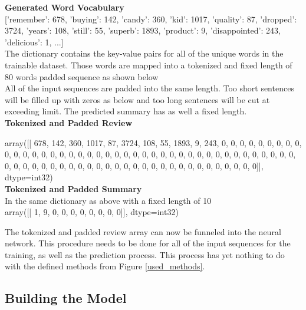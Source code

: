 \begin{tcolorbox}
	
	\textbf{Generated Word Vocabulary} \\
	
	['remember': 678, 'buying': 142, 'candy': 360, 
	'kid': 1017, 'quality': 87, 'dropped': 3724,
	 'years': 108, 'still': 55, 'superb': 1893, 
	 'product': 9, 'disappointed': 243, 'delicious': 1, ...] \\ 
 
    The dictionary contains the key-value pairs for all of the unique words in the trainable dataset. Those words are mapped into a tokenized and fixed length of 80 words padded sequence as shown below \\
    
    All of the input sequences are padded into the same length. Too short sentences will be filled up with zeros as below and too long sentences will be cut at exceeding limit. The predicted summary has as well a fixed length. \\
	
	\textbf{Tokenized and Padded Review}
	
	array([[ 678,  142,  360, 1017,   87, 3724,  108,   55, 1893,    9,  243,
	0,    0,    0,    0,    0,    0,    0,    0,    0,    0,    0,
	0,    0,    0,    0,    0,    0,    0,    0,    0,    0,    0,
	0,    0,    0,    0,    0,    0,    0,    0,    0,    0,    0,
	0,    0,    0,    0,    0,    0,    0,    0,    0,    0,    0,
	0,    0,    0,    0,    0,    0,    0,    0,    0,    0,    0,
	0,    0,    0,    0,    0,    0,    0,    0,    0,    0,    0,
	0,    0,    0]], dtype=int32) \\
	
	
	\textbf{Tokenized and Padded Summary} \\
	In the same dictionary as above with a fixed length of 10\\
	
	array([[ 1, 9, 0,  0,  0,  0,  0,  0,  0,  0]], dtype=int32)
\end{tcolorbox}

The tokenized and padded review array can now be funneled into the neural network. This procedure needs to be done for all of the input sequences for the training, as well as the prediction process. This process has yet nothing to do with the defined methods from Figure \ref{used_methods}.

\subsection{Building the Model}\label{ss:build}

